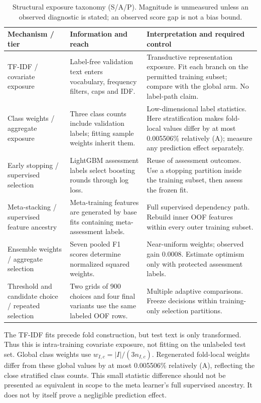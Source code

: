 \documentclass[doublecolumn]{ijcvsplatex}
\begin{document}
\begin{table}[t]
\small\centering
\caption{Structural exposure taxonomy (S/A/P). Magnitude is unmeasured unless an observed diagnostic is stated; an observed score gap is not a bias bound.}
\label{tab:taxonomy}
\begin{tabularx}{\textwidth}{P{2.8cm}P{4.1cm}X}
\toprule
Mechanism / tier & Information and reach & Interpretation and required control \\
\midrule
TF-IDF / covariate exposure & Label-free validation text enters vocabulary, frequency filters, caps and IDF. & Transductive representation exposure. Fit each branch on the permitted training subset; compare with the global arm. No label-path claim. \\
Class weights / aggregate exposure & Three class counts include validation labels; fitting sample weights inherit them. & Low-dimensional label statistics. Here stratification makes fold-local values differ by at most 0.005506\% relatively (A); measure any prediction effect separately. \\
Early stopping / supervised selection & LightGBM assessment labels select boosting rounds through log loss. & Reuse of assessment outcomes. Use a stopping partition inside the training subset, then assess the frozen fit. \\
Meta-stacking / supervised feature ancestry & Meta-training features are generated by base fits containing meta-assessment labels. & Full supervised dependency path. Rebuild inner OOF features within every outer training subset. \\
Ensemble weights / aggregate selection & Seven pooled F1 scores determine normalized squared weights. & Near-uniform weights; observed gain 0.0008. Estimate optimism only with protected assessment labels. \\
Threshold and candidate choice / repeated selection & Two grids of 900 choices and four final variants use the same labeled OOF rows. & Multiple adaptive comparisons. Freeze decisions within training-only selection partitions. \\
\bottomrule
\end{tabularx}
\end{table}

The TF-IDF fits precede fold construction, but test text is only transformed. Thus this is intra-training covariate exposure, not fitting on the unlabeled test set. Global class weights use $w_{I,c}=|I|/(3n_{I,c})$. Regenerated fold-local weights differ from these global values by at most 0.005506\% relatively (A), reflecting the close stratified class counts. This small statistic difference should not be presented as equivalent in scope to the meta learner's full supervised ancestry. It does not by itself prove a negligible prediction effect.
\end{document}
